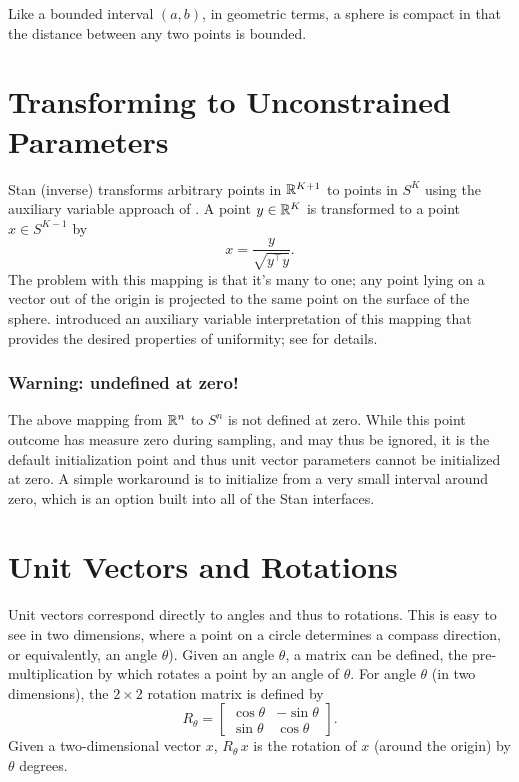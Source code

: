 Like a bounded interval $(a, b)$, in geometric terms, a sphere is
compact in that the distance between any two points is bounded.


\section{Transforming to Unconstrained Parameters}

Stan (inverse) transforms arbitrary points in $\reals^{K+1}$ to points
in $S^K$ using the auxiliary variable approach of
\cite{Marsaglia:1972}.  A point $y \in \reals^K$ is transformed to a
point $x \in S^{K-1}$ by
%
\[
x = \frac{y}{\sqrt{y^{\top} y}}.
\]
%
The problem with this mapping is that it's many to one; any point
lying on a vector out of the origin is projected to the same point on
the surface of the sphere.  \cite{Marsaglia:1972} introduced an
auxiliary variable interpretation of this mapping that provides the
desired properties of uniformity; see  for
details. 


\subsubsection{Warning: undefined at zero!}

The above mapping from $\reals^n$ to $S^n$ is not defined at zero.
While this point outcome has measure zero during sampling, and may
thus be ignored, it is the default initialization point and thus unit
vector parameters cannot be initialized at zero.  A simple workaround
is to initialize from a very small interval around zero, which is an
option built into all of the Stan interfaces.



\section{Unit Vectors and Rotations}

Unit vectors correspond directly to angles and thus to rotations.
This is easy to see in two dimensions, where a point on a circle
determines a compass direction, or equivalently, an angle $\theta$).
Given an angle $\theta$, a matrix can be defined, the
pre-multiplication by which rotates a point by an angle of $\theta$.
For angle $\theta$ (in two dimensions), the $2 \times 2$ rotation
matrix is defined by
\[
R_{\theta}
=
\begin{bmatrix}
\cos \theta & - \sin \theta 
\\
\sin \theta & \cos \theta
\end{bmatrix}.
\]
Given a two-dimensional vector $x$, $R_{\theta} \, x$ is the rotation
of $x$ (around the origin) by $\theta$ degrees.

